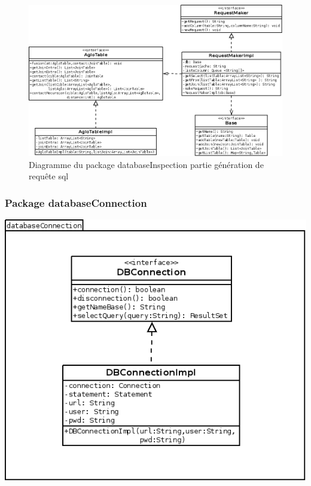 \documentclass[12pt]{report}
\begin{document}
\begin{figure}[h!]
\begin{center}
\includegraphics[scale=0.5]{bduml/cookingRequeste.png}
\caption{Diagramme du package databaseInspection partie génération de requête sql}
\end{center}
\end{figure}


\subsubsection*{Package databaseConnection}

\begin{center}
\includegraphics[scale=0.5]{bduml/databaseConnection.png}
\end{center}
\end{document}
